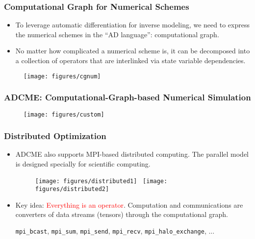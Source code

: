 \documentclass[usenames,dvipsnames]{beamer}
\begin{document}
\begin{frame}
	\frametitle{Computational Graph for Numerical Schemes}
	
	\begin{itemize}
		\item To leverage automatic differentiation for inverse modeling, we need to express the numerical schemes in the ``AD language'': computational graph. 
		\item No matter how complicated a numerical scheme is, it can be decomposed into a collection of operators that are interlinked via state variable dependencies. 
	\end{itemize}
	
	\begin{figure}[hbt]
		\texttt{[image: figures/cgnum]}
	\end{figure}
	
	
	
\end{frame}


\begin{frame}
	\frametitle{ADCME: Computational-Graph-based Numerical Simulation}
	
	\begin{figure}[hbt]
		\texttt{[image: figures/custom]}
	\end{figure}
\end{frame}

\begin{frame}
	\frametitle{Distributed Optimization}
	\begin{itemize}
		\item ADCME also supports MPI-based distributed computing. The parallel model is designed specially for scientific computing. 

	\begin{figure}[hbt]
		\centering
		\texttt{[image: figures/distributed1]}~
		\texttt{[image: figures/distributed2]}
	\end{figure}

\item Key idea: \textcolor{red}{Everything is an operator}. Computation and communications are converters of data streams (tensors) through the computational graph. 

\begin{center}
\texttt{mpi\_bcast}, \texttt{mpi\_sum}, \texttt{mpi\_send}, \texttt{mpi\_recv}, \texttt{mpi\_halo\_exchange}, ...
\end{center}

	\end{itemize}
\end{frame}
\end{document}
